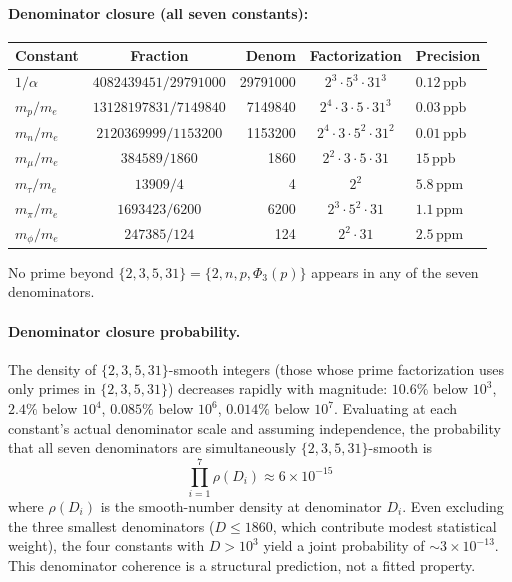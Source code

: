 \documentclass[12pt,a4paper]{article}
\theoremstyle{definition}
\newcommand{\Phithree}{\Phi_3}
\newcommand{\ppb}{\,\mathrm{ppb}}
\newcommand{\ppm}{\,\mathrm{ppm}}
\begin{document}
\paragraph{Denominator closure (all seven constants):}
\begin{center}
\begin{tabular}{lcrcl}
\toprule
Constant & Fraction & Denom & Factorization & Precision \\
\midrule
$1/\alpha$  & $4082439451/29791000$ & 29791000 & $2^3 \cdot 5^3 \cdot 31^3$ & $0.12\ppb$ \\
$m_p/m_e$   & $13128197831/7149840$ & 7149840  & $2^4 \cdot 3 \cdot 5 \cdot 31^3$ & $0.03\ppb$ \\
$m_n/m_e$   & $2120369999/1153200$  & 1153200  & $2^4 \cdot 3 \cdot 5^2 \cdot 31^2$ & $0.01\ppb$ \\
$m_\mu/m_e$ & $384589/1860$         & 1860     & $2^2 \cdot 3 \cdot 5 \cdot 31$ & $15\ppb$ \\
$m_\tau/m_e$& $13909/4$             & 4        & $2^2$ & $5.8\ppm$ \\
$m_\pi/m_e$ & $1693423/6200$        & 6200     & $2^3 \cdot 5^2 \cdot 31$ & $1.1\ppm$ \\
$m_\phi/m_e$& $247385/124$          & 124      & $2^2 \cdot 31$ & $2.5\ppm$ \\
\bottomrule
\end{tabular}
\end{center}

No prime beyond $\{2, 3, 5, 31\} = \{2, n, p, \Phithree(p)\}$ appears in
any of the seven denominators.

\paragraph{Denominator closure probability.}
The density of $\{2,3,5,31\}$-smooth integers (those whose prime
factorization uses only primes in $\{2,3,5,31\}$) decreases rapidly
with magnitude: $10.6\%$ below $10^3$, $2.4\%$ below $10^4$,
$0.085\%$ below $10^6$, $0.014\%$ below $10^7$. Evaluating at each
constant's actual denominator scale and assuming independence, the
probability that all seven denominators are simultaneously
$\{2,3,5,31\}$-smooth is
\[
  \prod_{i=1}^{7} \rho(D_i) \approx 6 \times 10^{-15}
\]
where $\rho(D_i)$ is the smooth-number density at denominator $D_i$.
Even excluding the three smallest denominators ($D \leq 1860$, which
contribute modest statistical weight), the four constants with
$D > 10^3$ yield a joint probability of $\sim 3 \times 10^{-13}$.
This denominator coherence is a structural prediction, not a fitted
property.
\end{document}
